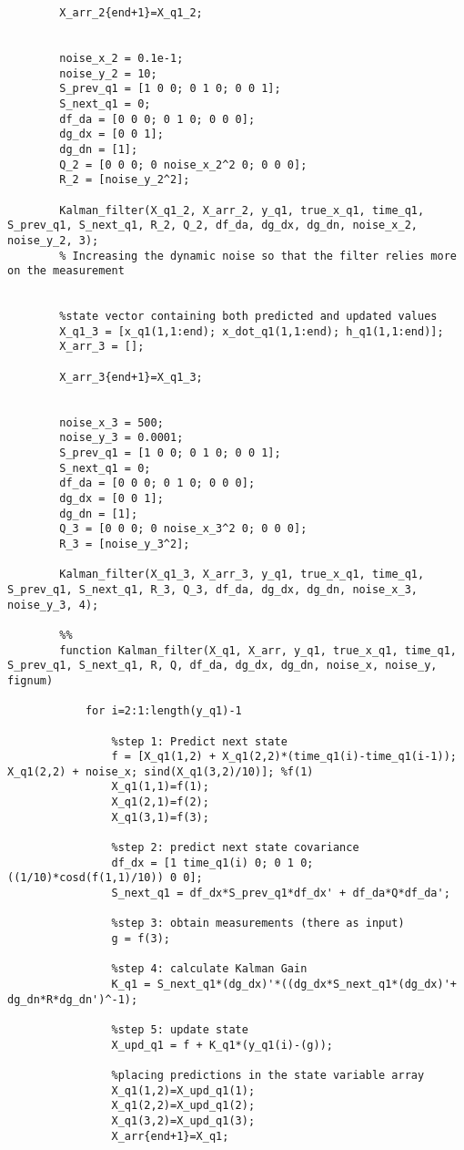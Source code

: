 \documentclass{article}
\begin{document}
\begin{verbatim}
		X_arr_2{end+1}=X_q1_2;
		
		
		noise_x_2 = 0.1e-1;
		noise_y_2 = 10;
		S_prev_q1 = [1 0 0; 0 1 0; 0 0 1];
		S_next_q1 = 0;
		df_da = [0 0 0; 0 1 0; 0 0 0];
		dg_dx = [0 0 1];
		dg_dn = [1];
		Q_2 = [0 0 0; 0 noise_x_2^2 0; 0 0 0];
		R_2 = [noise_y_2^2];
		
		Kalman_filter(X_q1_2, X_arr_2, y_q1, true_x_q1, time_q1, S_prev_q1, S_next_q1, R_2, Q_2, df_da, dg_dx, dg_dn, noise_x_2, noise_y_2, 3);
		% Increasing the dynamic noise so that the filter relies more on the measurement
		
		
		%state vector containing both predicted and updated values
		X_q1_3 = [x_q1(1,1:end); x_dot_q1(1,1:end); h_q1(1,1:end)];
		X_arr_3 = [];
		
		X_arr_3{end+1}=X_q1_3;
		
		
		noise_x_3 = 500;
		noise_y_3 = 0.0001;
		S_prev_q1 = [1 0 0; 0 1 0; 0 0 1];
		S_next_q1 = 0;
		df_da = [0 0 0; 0 1 0; 0 0 0];
		dg_dx = [0 0 1];
		dg_dn = [1];
		Q_3 = [0 0 0; 0 noise_x_3^2 0; 0 0 0];
		R_3 = [noise_y_3^2];
		
		Kalman_filter(X_q1_3, X_arr_3, y_q1, true_x_q1, time_q1, S_prev_q1, S_next_q1, R_3, Q_3, df_da, dg_dx, dg_dn, noise_x_3, noise_y_3, 4);
		
		%%
		function Kalman_filter(X_q1, X_arr, y_q1, true_x_q1, time_q1, S_prev_q1, S_next_q1, R, Q, df_da, dg_dx, dg_dn, noise_x, noise_y, fignum)
		    
		    for i=2:1:length(y_q1)-1
		        
		        %step 1: Predict next state
		        f = [X_q1(1,2) + X_q1(2,2)*(time_q1(i)-time_q1(i-1)); X_q1(2,2) + noise_x; sind(X_q1(3,2)/10)]; %f(1)
		        X_q1(1,1)=f(1);
		        X_q1(2,1)=f(2);
		        X_q1(3,1)=f(3);
		        
		        %step 2: predict next state covariance
		        df_dx = [1 time_q1(i) 0; 0 1 0; ((1/10)*cosd(f(1,1)/10)) 0 0];
		        S_next_q1 = df_dx*S_prev_q1*df_dx' + df_da*Q*df_da';
		    
		        %step 3: obtain measurements (there as input)
		        g = f(3);
		    
		        %step 4: calculate Kalman Gain
		        K_q1 = S_next_q1*(dg_dx)'*((dg_dx*S_next_q1*(dg_dx)'+ dg_dn*R*dg_dn')^-1);
		    
		        %step 5: update state
		        X_upd_q1 = f + K_q1*(y_q1(i)-(g));
		
		        %placing predictions in the state variable array
		        X_q1(1,2)=X_upd_q1(1);
		        X_q1(2,2)=X_upd_q1(2);
		        X_q1(3,2)=X_upd_q1(3);
		        X_arr{end+1}=X_q1;
		    

\end{verbatim}
\end{document}
